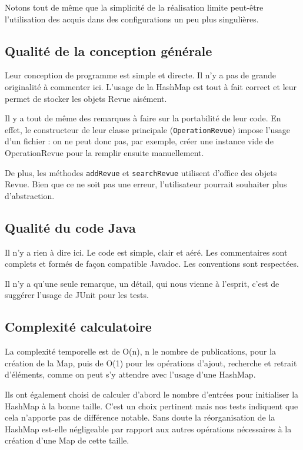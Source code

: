 \documentclass[a4paper,10pt]{article}
\begin{document}
	Notons tout de même que la simplicité de la réalisation limite peut-être l'utilisation des acquis dans des configurations un peu plus singulières.

\subsection{Qualité de la conception générale}

	Leur conception de programme est simple et directe. Il n'y a pas de grande originalité à commenter ici. L'usage de la HashMap est tout à fait correct et leur permet de stocker les objets Revue aisément.
	
	Il y a tout de même des remarques à faire sur la portabilité de leur code. En effet, le constructeur de leur classe principale (\texttt{OperationRevue}) impose l'usage d'un fichier : on ne peut donc pas, par exemple, créer une instance vide de OperationRevue pour la remplir ensuite manuellement.
	
	De plus, les méthodes \texttt{addRevue} et \texttt{searchRevue} utilisent d'office des objets Revue. Bien que ce ne soit pas une erreur, l'utilisateur pourrait souhaiter plus d'abstraction.

\subsection{Qualité du code Java}

	Il n'y a rien à dire ici. Le code est simple, clair et aéré. Les commentaires sont complets et formés de façon compatible Javadoc. Les conventions sont respectées.
	
	Il n'y a qu'une seule remarque, un détail, qui nous vienne à l'esprit, c'est de suggérer l'usage de JUnit pour les tests.

\subsection{Complexité calculatoire}

	La complexité temporelle est de O(n), n le nombre de publications, pour la création de la Map, puis de O(1) pour les opérations d'ajout, recherche et retrait d'éléments, comme on peut s'y attendre avec l'usage d'une HashMap.
	
	Ils ont également choisi de calculer d'abord le nombre d'entrées pour initialiser la HashMap à la bonne taille. C'est un choix pertinent mais nos tests indiquent que cela n'apporte pas de différence notable. Sans doute la réorganisation de la HashMap est-elle négligeable par rapport aux autres opérations nécessaires à la création d'une Map de cette taille.
	
\end{document}
